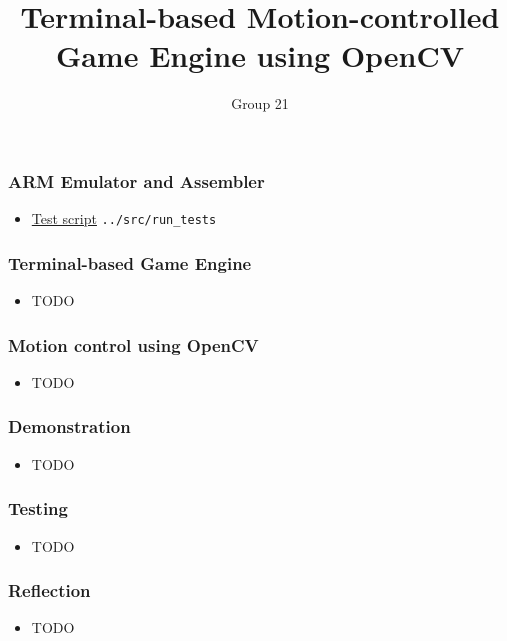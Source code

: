 \documentclass{beamer}
\title{Terminal-based Motion-controlled Game Engine using OpenCV}
\author{Group 21}
\begin{document}
	
\frame{\titlepage}

\begin{frame}
	\frametitle{ARM Emulator and Assembler}
	\begin{itemize}
		\item \href{run:../src/run_tests}{Test script} \texttt{../src/run\_tests}
	\end{itemize}
\end{frame}

\begin{frame}
	\frametitle{Terminal-based Game Engine}
	\begin{itemize}
		\item TODO
	\end{itemize}
\end{frame}

\begin{frame}
\frametitle{Motion control using OpenCV}
\begin{itemize}
	\item TODO
\end{itemize}
\end{frame}

\begin{frame}
\frametitle{Demonstration}
\begin{itemize}
	\item TODO
\end{itemize}
\end{frame}

\begin{frame}
\frametitle{Testing}
\begin{itemize}
	\item TODO
\end{itemize}
\end{frame}

\begin{frame}
\frametitle{Reflection}
\begin{itemize}
	\item TODO
\end{itemize}
\end{frame}
\end{document}
